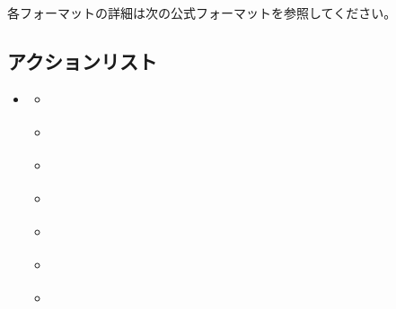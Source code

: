 \documentclass[letterpaper,10pt,dvipdfmx]{sphinxmanual}
\begin{document}
\sphinxAtStartPar
各フォーマットの詳細は次の公式フォーマットを参照してください。

\sphinxstepscope


\subsection{アクションリスト}
\label{\detokenize{auto/actionlist:actionlist-act}}\label{\detokenize{auto/actionlist:act-act}}\label{\detokenize{auto/actionlist:id1}}\label{\detokenize{auto/actionlist::doc}}
\begin{sphinxShadowBox}
\begin{itemize}
\item {} 
\sphinxAtStartPar
{}\label{\detokenize{auto/actionlist:id58}}{\hyperref[\detokenize{auto/actionlist:id3}]{}}
\begin{itemize}
\item {} 
\sphinxAtStartPar
{}\label{\detokenize{auto/actionlist:id59}}{\hyperref[\detokenize{auto/actionlist:act-end}]{}}

\item {} 
\sphinxAtStartPar
{}\label{\detokenize{auto/actionlist:id60}}{\hyperref[\detokenize{auto/actionlist:act-charge}]{}}

\item {} 
\sphinxAtStartPar
{}\label{\detokenize{auto/actionlist:id61}}{\hyperref[\detokenize{auto/actionlist:act-draw}]{}}

\item {} 
\sphinxAtStartPar
{}\label{\detokenize{auto/actionlist:id62}}{\hyperref[\detokenize{auto/actionlist:act-attack}]{}}

\item {} 
\sphinxAtStartPar
{}\label{\detokenize{auto/actionlist:id63}}{\hyperref[\detokenize{auto/actionlist:act-block}]{}}

\item {} 
\sphinxAtStartPar
{}\label{\detokenize{auto/actionlist:id64}}{\hyperref[\detokenize{auto/actionlist:act-damagejudge}]{}}

\item {} 
\sphinxAtStartPar
{}\label{\detokenize{auto/actionlist:id65}}{\hyperref[\detokenize{auto/actionlist:act-nextgeneration}]{}}


\end{itemize}
\end{itemize}
\end{sphinxShadowBox}
\end{document}
